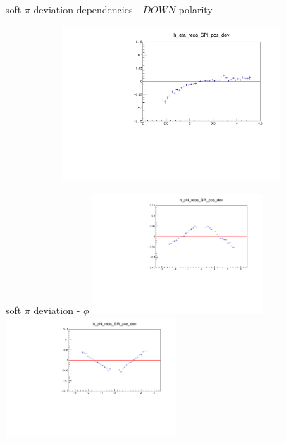 \documentclass[11pt]{beamer}
\begin{document}
\begin{frame}{soft $\pi$ deviation dependencies - $DOWN$ polarity}
\begin{figure}
\begin{subfigure}{0.45\textwidth}
\end{subfigure}
\begin{subfigure}{0.45\textwidth}
\includegraphics[width=0.9\textwidth]{first/down_pdf/deviation/h_eta_reco_SPi_pos_dev.pdf}
\end{subfigure}
\end{figure}
\end{frame}
\begin{frame}{soft $\pi$ deviation - $\phi$}
\centering
\includegraphics[width=0.48\textwidth]{first/up_pdf/deviation/h_phi_reco_SPi_pos_dev.pdf}
\includegraphics[width=0.48\textwidth]{first/down_pdf/deviation/h_phi_reco_SPi_pos_dev.pdf}
\end{frame}
\end{document}
